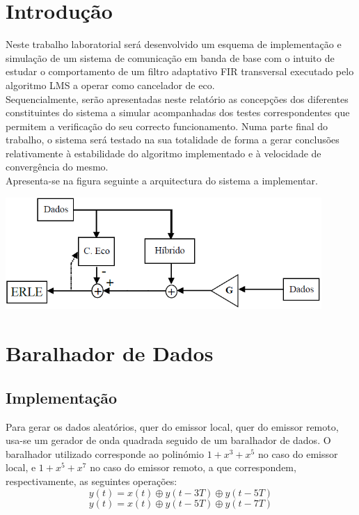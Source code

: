 \documentclass[a4paper,11pt]{report}
\begin{document}

\chapter{Introdução}

Neste trabalho laboratorial será desenvolvido um esquema de implementação e simulação de um sistema de comunicação em banda de base com o intuito de estudar o comportamento de um filtro adaptativo FIR transversal executado pelo algoritmo LMS a operar como cancelador de eco.\\

Sequencialmente, serão apresentadas neste relatório as concepções dos diferentes constituintes do sistema a simular acompanhadas dos testes correspondentes que permitem a verificação do seu correcto funcionamento. Numa parte final do trabalho, o sistema será testado na sua totalidade de forma a gerar conclusões relativamente à estabilidade do algoritmo implementado e à velocidade de convergência do mesmo.\\

Apresenta-se na figura seguinte a arquitectura do sistema a implementar.

\begin{center}
     \includegraphics[angle=0,width=0.9\textwidth]{arqui.png}
     \label{fig:arqui}
\end{center}

\chapter{Baralhador de Dados}
\section{Implementação}

Para gerar os dados aleatórios, quer do emissor local, quer do emissor remoto, usa-se um gerador de onda quadrada seguido de um baralhador de dados. O baralhador utilizado corresponde ao polinómio $1+x^3+x^5$ no caso do emissor local, e $1+x^5+x^7$ no caso do emissor remoto, a que correspondem, respectivamente, as seguintes operações:
$$y(t)=x(t)\oplus y(t-3T)\oplus y(t-5T)$$
$$y(t)=x(t)\oplus y(t-5T)\oplus y(t-7T)$$
\end{document}
